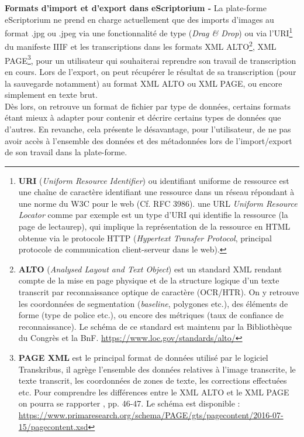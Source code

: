 \textbf{Formats d'import et d'export dans eScriptorium -}
La plate-forme eScriptorium ne prend en charge actuellement que des imports d'images au format .jpg ou .jpeg via une fonctionnalité de type  (\textit{Drag \& Drop}) ou via l'URI\footnote{\textbf{URI} (\textit{Uniform Resource Identifier}) ou identifiant uniforme de ressource est une chaîne de caractère identifiant une ressource dans un réseau répondant à une norme du W3C pour le web (Cf. RFC 3986). une URL \textit{Uniform Resource Locator} comme par exemple  est un type d'URI qui identifie la ressource (la page de lectaurep), qui implique la représentation de la ressource en HTML obtenue via le protocole HTTP (\textit{Hypertext Transfer Protocol}, principal protocole de communication client-serveur dans le web).} du manifeste IIIF et les transcriptions dans les formats XML ALTO\footnote{\textbf{ALTO} (\textit{Analysed Layout and Text Object}) est un standard XML rendant compte de la mise en page physique et de la structure logique d'un texte transcrit par reconnaissance optique de caractère (OCR/HTR). On y retrouve les coordonnées de segmentation (\textit{baseline}, polygones etc.), des éléments de forme (type de police etc.), ou encore des métriques (taux de confiance de reconnaissance). Le schéma de ce standard est maintenu par la Bibliothèque du Congrès et la BnF. \url{https://www.loc.gov/standards/alto/}}, XML PAGE\footnote{\textbf{PAGE XML} est le principal format de données utilisé par le logiciel Transkribus, il agrège l'ensemble des données relatives à l'image transcrite, le texte transcrit, les coordonnées de zones de texte, les corrections effectuées etc. Pour comprendre les différences entre le XML ALTO et le XML PAGE on pourra se rapporter \cite{bonhomme_defis_2018}, pp. 46-47. Le schéma est disponible : \url{https://www.primaresearch.org/schema/PAGE/gts/pagecontent/2016-07-15/pagecontent.xsd}}, pour un utilisateur qui souhaiterai reprendre son travail de transcription en cours. Lors de l'export, on peut récupérer le résultat de sa transcription (pour la sauvegarde notamment) au format XML ALTO ou XML PAGE, ou encore simplement en texte brut.\\

Dès lors, on retrouve un format de fichier par type de données, certains formats étant mieux à adapter pour contenir et décrire certains types de données que d'autres. En revanche, cela présente le désavantage, pour l'utilisateur, de ne pas avoir accès à l'ensemble des données et des métadonnées lors de l'import/export de son travail dans la plate-forme.\\

